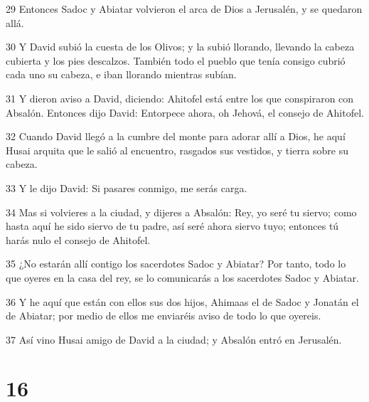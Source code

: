 \par 29 Entonces Sadoc y Abiatar volvieron el arca de Dios a Jerusalén, y se quedaron allá.
\par 30 Y David subió la cuesta de los Olivos; y la subió llorando, llevando la cabeza cubierta y los pies descalzos. También todo el pueblo que tenía consigo cubrió cada uno su cabeza, e iban llorando mientras subían.
\par 31 Y dieron aviso a David, diciendo: Ahitofel está entre los que conspiraron con Absalón. Entonces dijo David: Entorpece ahora, oh Jehová, el consejo de Ahitofel.
\par 32 Cuando David llegó a la cumbre del monte para adorar allí a Dios, he aquí Husai arquita que le salió al encuentro, rasgados sus vestidos, y tierra sobre su cabeza.
\par 33 Y le dijo David: Si pasares conmigo, me serás carga.
\par 34 Mas si volvieres a la ciudad, y dijeres a Absalón: Rey, yo seré tu siervo; como hasta aquí he sido siervo de tu padre, así seré ahora siervo tuyo; entonces tú harás nulo el consejo de Ahitofel. 
\par 35 ¿No estarán allí contigo los sacerdotes Sadoc y Abiatar? Por tanto, todo lo que oyeres en la casa del rey, se lo comunicarás a los sacerdotes Sadoc y Abiatar.
\par 36 Y he aquí que están con ellos sus dos hijos, Ahimaas el de Sadoc y Jonatán el de Abiatar; por medio de ellos me enviaréis aviso de todo lo que oyereis.
\par 37 Así vino Husai amigo de David a la ciudad; y Absalón entró en Jerusalén.

\chapter{16}

